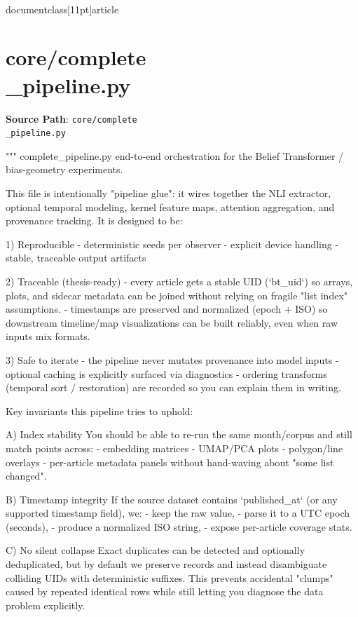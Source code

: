 \\documentclass[11pt]{article}
\begin{document}
\section*{core/complete\\_pipeline.py}
\textbf{Source Path}: \texttt{core/complete\\_pipeline.py}\par
\bigskip
\begin{CodeBlock}
"""
complete_pipeline.py  end-to-end orchestration for the Belief Transformer / bias-geometry experiments.

This file is intentionally "pipeline glue": it wires together the NLI extractor, optional temporal modeling,
kernel feature maps, attention aggregation, and provenance tracking. It is designed to be:

1) Reproducible
   - deterministic seeds per observer
   - explicit device handling
   - stable, traceable output artifacts

2) Traceable (thesis-ready)
   - every article gets a stable UID (`bt_uid`) so arrays, plots, and sidecar metadata can be joined without
     relying on fragile "list index" assumptions.
   - timestamps are preserved and normalized (epoch + ISO) so downstream timeline/map visualizations
     can be built reliably, even when raw inputs mix formats.

3) Safe to iterate
   - the pipeline never mutates provenance into model inputs
   - optional caching is explicitly surfaced via diagnostics
   - ordering transforms (temporal sort / restoration) are recorded so you can explain them in writing.

Key invariants this pipeline tries to uphold:

A) Index stability
   You should be able to re-run the same month/corpus and still match points across:
     - embedding matrices
     - UMAP/PCA plots
     - polygon/line overlays
     - per-article metadata panels
   without hand-waving about "some list changed".

B) Timestamp integrity
   If the source dataset contains `published_at` (or any supported timestamp field), we:
     - keep the raw value,
     - parse it to a UTC epoch (seconds),
     - produce a normalized ISO string,
     - expose per-article coverage stats.

C) No silent collapse
   Exact duplicates can be detected and optionally deduplicated, but by default we preserve records and
   instead disambiguate colliding UIDs with deterministic suffixes. This prevents accidental "clumps"
   caused by repeated identical rows while still letting you diagnose the data problem explicitly.


\end{CodeBlock}
\end{document}
